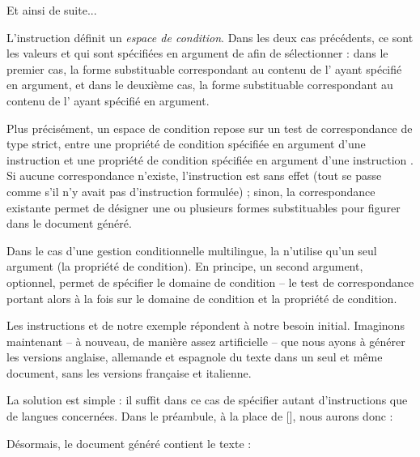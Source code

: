 \documentclass{article}
\begin{document}
\resumepar Et ainsi de suite...

L'instruction  définit un \emph{espace de condition}. Dans les deux cas précédents, ce sont les valeurs  et  qui sont spécifiées en argument de  afin de sélectionner : dans le premier cas, la forme substituable correspondant au contenu de l' ayant  spécifié en argument, et dans le deuxième cas, la forme substituable correspondant au contenu de l' ayant  spécifié en argument.

Plus précisément, un espace de condition repose sur un test de correspondance de type  strict, entre une propriété de condition spécifiée en argument d'une instruction  et une propriété de condition spécifiée en argument d'une instruction . Si aucune correspondance n'existe, l'instruction  est sans effet (tout se passe comme s'il n'y avait pas d'instruction formulée) ; sinon, la correspondance existante permet de désigner une ou plusieurs formes substituables pour figurer dans le document généré.

Dans le cas d'une gestion conditionnelle multilingue, la  n'utilise qu'un seul argument (la propriété de condition). En principe, un second argument, optionnel, permet de spécifier le domaine de condition -- le test de correspondance portant alors à la fois sur le domaine de condition et la propriété de condition.

\tutostep
Les instructions  et  de notre exemple répondent à notre besoin initial. Imaginons maintenant -- à nouveau, de manière assez artificielle -- que nous ayons à générer les versions anglaise, allemande et espagnole du texte dans un seul et même document, sans les versions française et italienne.

La solution est simple : il suffit dans ce cas de spécifier autant d'instructions  que de langues concernées. Dans le préambule, à la place de [], nous aurons donc :

\begin{codeblock}
\end{codeblock}

Désormais, le document généré contient le texte :
\end{document}
